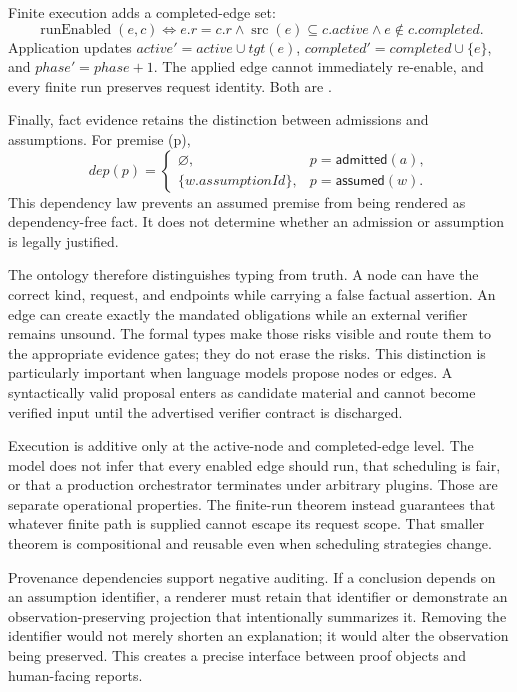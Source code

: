 Finite execution adds a completed-edge set:
\begin{equation}
\operatorname{runEnabled}(e,c)\iff e.r=c.r\land
\operatorname{src}(e)\subseteq c.active\land e\notin c.completed.
\label{eq:run-enabled}
\end{equation}
Application updates $active'=active\cup tgt(e)$, $completed'=completed\cup\{e\}$, and $phase'=phase+1$. The applied edge cannot immediately re-enable, and every finite run preserves request identity. Both are \formalized{}.

Finally, fact evidence retains the distinction between admissions and assumptions. For premise (p),
\begin{equation}
dep(p)=
\begin{cases}
\varnothing,&p=\mathsf{admitted}(a),\\
\{w.assumptionId\},&p=\mathsf{assumed}(w).
\end{cases}
\label{eq:premise-dependency}
\end{equation}
This \formalized{} dependency law prevents an assumed premise from being rendered as dependency-free fact. It does not determine whether an admission or assumption is legally justified.

The ontology therefore distinguishes typing from truth. A node can have the correct kind, request, and endpoints while carrying a false factual assertion. An edge can create exactly the mandated obligations while an external verifier remains unsound. The formal types make those risks visible and route them to the appropriate evidence gates; they do not erase the risks. This distinction is particularly important when language models propose nodes or edges. A syntactically valid proposal enters as candidate material and cannot become verified input until the advertised verifier contract is discharged.

Execution is additive only at the active-node and completed-edge level. The model does not infer that every enabled edge should run, that scheduling is fair, or that a production orchestrator terminates under arbitrary plugins. Those are separate operational properties. The finite-run theorem instead guarantees that whatever finite path is supplied cannot escape its request scope. That smaller theorem is compositional and reusable even when scheduling strategies change.

Provenance dependencies support negative auditing. If a conclusion depends on an assumption identifier, a renderer must retain that identifier or demonstrate an observation-preserving projection that intentionally summarizes it. Removing the identifier would not merely shorten an explanation; it would alter the observation being preserved. This creates a precise interface between proof objects and human-facing reports.

